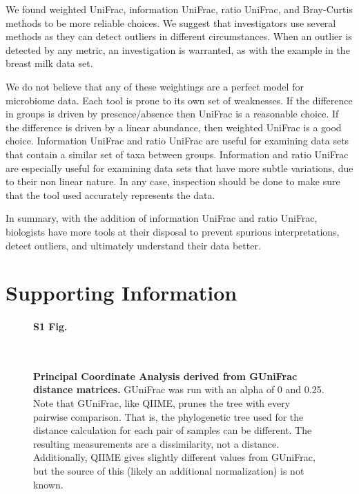 \documentclass[10pt,letterpaper]{article}
\begin{document}
We found weighted UniFrac, information UniFrac, ratio UniFrac, and Bray-Curtis methods to be more reliable choices. We suggest that investigators use several methods as they can detect outliers in different circumstances. When an outlier is detected by any metric, an investigation is warranted, as with the example in the breast milk data set.

We do not believe that any of these weightings are a perfect model for microbiome data. Each tool is prone to its own set of weaknesses. If the difference in groups is driven by presence/absence then UniFrac is a reasonable choice. If the difference is driven by a linear abundance, then weighted UniFrac is a good choice. Information UniFrac and ratio UniFrac are useful for examining data sets that contain a similar set of taxa between groups. Information and ratio UniFrac are especially useful for examining data sets that have more subtle variations, due to their non linear nature. In any case, inspection should be done to make sure that the tool used accurately represents the data.

In summary, with the addition of information UniFrac and ratio UniFrac, biologists have more tools at their disposal to prevent spurious interpretations, detect outliers, and ultimately understand their data better.

\section*{Supporting Information}

\begin{figure}[h]
\paragraph*{S1 Fig.}\mbox{}\\
\caption[Principal Coordinate Analysis derived from GUniFrac distance matrices.]{{\bf Principal Coordinate Analysis derived from GUniFrac distance matrices. } GUniFrac was run with an alpha of 0 and 0.25. Note that GUniFrac, like QIIME, prunes the tree with every pairwise comparison. That is, the phylogenetic tree used for the distance calculation for each pair of samples can be different. The resulting measurements are a dissimilarity, not a distance. Additionally, QIIME gives slightly different values from GUniFrac, but the source of this (likely an additional normalization) is not known.}
\label{gunifrac_1}
\end{figure}
\end{document}
